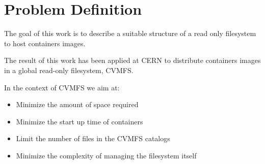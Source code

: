 \chapter{Problem Definition}\label{ch:ProblemDefinition}

The goal of this work is to describe a suitable structure of a read only
filesystem to host containers images.

The result of this work has been applied at CERN to distribute containers
images in a global read-only filesystem, CVMFS.

In the context of CVMFS we aim at:
\begin{itemize}
\item Minimize the amount of space required
\item Minimize the start up time of containers
\item Limit the number of files in the CVMFS catalogs 
\item Minimize the complexity of managing the filesystem itself
\end{itemize}


